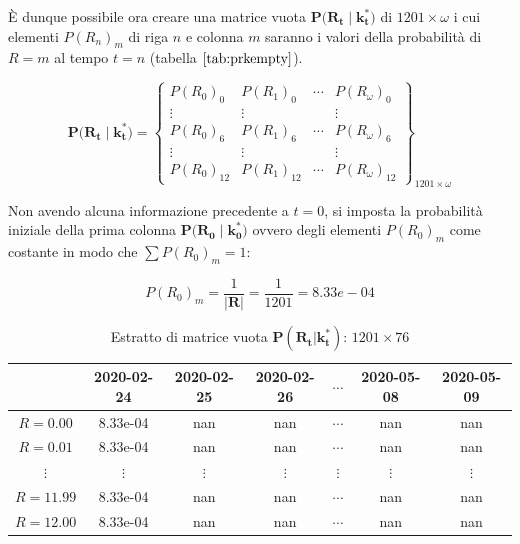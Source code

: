 \documentclass[11pt]{article}
\begin{document}
    È dunque possibile ora creare una matrice vuota
\(\mathbf{P\big(R_t \;\big|\; k_t^*\big)}\) di \(1201 \times \omega\) i
cui elementi \(P(R_n)_m\) di riga \(n\) e colonna \(m\) saranno i valori
della probabilità di \(R=m\) al tempo \(t=n\) (tabella
\(\ref{tab:prkempty}\)).

    \begin{equation}\label{eq:matriceprk}
\mathbf{P\big(R_t \;\big|\; k_t^*\big)} = 
\begin{Bmatrix}
P(R_0)_{0} &  P(R_1)_{0} & \cdots  & P(R_\omega)_{0} \\ 
\vdots & \vdots & & \vdots \\
P(R_0)_{6} &  P(R_1)_{6} & \cdots & P(R_\omega)_{6} \\ 
\vdots & \vdots &  & \vdots \\
P(R_0)_{12} & P(R_1)_{12} & \cdots & P(R_\omega)_{12}
\end{Bmatrix}_{1201 \times \omega}
\end{equation}

    Non avendo alcuna informazione precedente a \(t=0\), si imposta la
probabilità iniziale della prima colonna
\(\mathbf{P\big(R_0 \;\big|\; k_0^*\big)}\) ovvero degli elementi
\(P(R_0)_m\) come costante in modo che \(\sum P(R_0)_m = 1\):

    \[P(R_0)_{m} = \frac{1}{ | \mathbf{R} | } = \frac{1}{1201} = 8.33e-04\]

    
    
\begin{table}
  \begin{center}
    \caption{Estratto di matrice vuota $\mathbf{P(R_t|k_t^*)}$: $1201 \times 76$}
    \label{tab:prkempty}
    \begin{tabular}{c|c|c|c|c|c|c|}
          & 2020-02-24 & 
          2020-02-25 &
          2020-02-26 &
          $\cdots$ & 
          2020-05-08 & 
          2020-05-09 \\
        \toprule
        $R=0.00$ & 8.33e-04 & nan & nan & $\cdots$ & nan & nan \\
        \midrule
        $R=0.01$ & 8.33e-04 & nan & nan & $\cdots$ & nan & nan \\
        \midrule
        $\vdots$ & $\vdots$ & $\vdots$ & $\vdots$ & $\vdots$ & $\vdots$ & $\vdots$ \\
        \midrule
        $R=11.99$ & 8.33e-04 & nan & nan & $\cdots$ & nan & nan \\
        \midrule
        $R=12.00$ & 8.33e-04 & nan & nan & $\cdots$ & nan & nan \\
        \bottomrule
    \end{tabular}
  \end{center}
\end{table}
        
\end{document}
